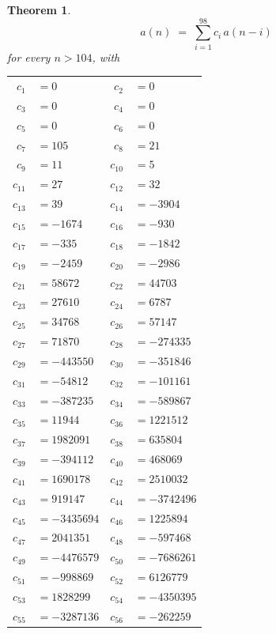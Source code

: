 \documentclass[11pt,a4paper]{article}
\theoremstyle{plain}
\newtheorem{theorem}{Theorem}
\theoremstyle{definition}
\begin{document}
\begin{theorem}
\[
a(n)\;=\;\sum_{i=1}^{98}c_i\,a(n-i)
\]
for every $n>104$, with
\begin{center}\footnotesize
\begin{tabular}{r@{\,}l@{\qquad}r@{\,}l}
$c_{1}$ & $=0$ & $c_{2}$ & $=0$ \\
$c_{3}$ & $=0$ & $c_{4}$ & $=0$ \\
$c_{5}$ & $=0$ & $c_{6}$ & $=0$ \\
$c_{7}$ & $=105$ & $c_{8}$ & $=21$ \\
$c_{9}$ & $=11$ & $c_{10}$ & $=5$ \\
$c_{11}$ & $=27$ & $c_{12}$ & $=32$ \\
$c_{13}$ & $=39$ & $c_{14}$ & $=-3904$ \\
$c_{15}$ & $=-1674$ & $c_{16}$ & $=-930$ \\
$c_{17}$ & $=-335$ & $c_{18}$ & $=-1842$ \\
$c_{19}$ & $=-2459$ & $c_{20}$ & $=-2986$ \\
$c_{21}$ & $=58672$ & $c_{22}$ & $=44703$ \\
$c_{23}$ & $=27610$ & $c_{24}$ & $=6787$ \\
$c_{25}$ & $=34768$ & $c_{26}$ & $=57147$ \\
$c_{27}$ & $=71870$ & $c_{28}$ & $=-274335$ \\
$c_{29}$ & $=-443550$ & $c_{30}$ & $=-351846$ \\
$c_{31}$ & $=-54812$ & $c_{32}$ & $=-101161$ \\
$c_{33}$ & $=-387235$ & $c_{34}$ & $=-589867$ \\
$c_{35}$ & $=11944$ & $c_{36}$ & $=1221512$ \\
$c_{37}$ & $=1982091$ & $c_{38}$ & $=635804$ \\
$c_{39}$ & $=-394112$ & $c_{40}$ & $=468069$ \\
$c_{41}$ & $=1690178$ & $c_{42}$ & $=2510032$ \\
$c_{43}$ & $=919147$ & $c_{44}$ & $=-3742496$ \\
$c_{45}$ & $=-3435694$ & $c_{46}$ & $=1225894$ \\
$c_{47}$ & $=2041351$ & $c_{48}$ & $=-597468$ \\
$c_{49}$ & $=-4476579$ & $c_{50}$ & $=-7686261$ \\
$c_{51}$ & $=-998869$ & $c_{52}$ & $=6126779$ \\
$c_{53}$ & $=1828299$ & $c_{54}$ & $=-4350395$ \\
$c_{55}$ & $=-3287136$ & $c_{56}$ & $=-262259$ \\

\end{tabular}
\end{center}
\end{theorem}
\end{document}
